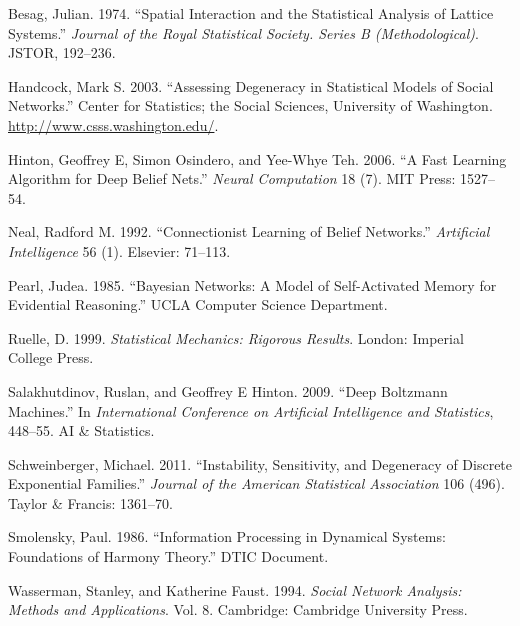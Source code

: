 \documentclass[]{article}
\theoremstyle{definition}
\begin{document}
\hypertarget{refs}{}
\hypertarget{ref-besag1974spatial}{}
Besag, Julian. 1974. ``Spatial Interaction and the Statistical Analysis
of Lattice Systems.'' \emph{Journal of the Royal Statistical Society.
Series B (Methodological)}. JSTOR, 192--236.

\hypertarget{ref-handcock2003assessing}{}
Handcock, Mark S. 2003. ``Assessing Degeneracy in Statistical Models of
Social Networks.'' Center for Statistics; the Social Sciences,
University of Washington. \url{http://www.csss.washington.edu/}.

\hypertarget{ref-hinton2006fast}{}
Hinton, Geoffrey E, Simon Osindero, and Yee-Whye Teh. 2006. ``A Fast
Learning Algorithm for Deep Belief Nets.'' \emph{Neural Computation} 18
(7). MIT Press: 1527--54.

\hypertarget{ref-neal1992connectionist}{}
Neal, Radford M. 1992. ``Connectionist Learning of Belief Networks.''
\emph{Artificial Intelligence} 56 (1). Elsevier: 71--113.

\hypertarget{ref-pearl985bayesian}{}
Pearl, Judea. 1985. ``Bayesian Networks: A Model of Self-Activated
Memory for Evidential Reasoning.'' UCLA Computer Science Department.

\hypertarget{ref-ruelle1999statistical}{}
Ruelle, D. 1999. \emph{Statistical Mechanics: Rigorous Results}. London:
Imperial College Press.

\hypertarget{ref-salakhutdinov2009deep}{}
Salakhutdinov, Ruslan, and Geoffrey E Hinton. 2009. ``Deep Boltzmann
Machines.'' In \emph{International Conference on Artificial Intelligence
and Statistics}, 448--55. AI \& Statistics.

\hypertarget{ref-schweinberger2011instability}{}
Schweinberger, Michael. 2011. ``Instability, Sensitivity, and Degeneracy
of Discrete Exponential Families.'' \emph{Journal of the American
Statistical Association} 106 (496). Taylor \& Francis: 1361--70.

\hypertarget{ref-smolensky1986information}{}
Smolensky, Paul. 1986. ``Information Processing in Dynamical Systems:
Foundations of Harmony Theory.'' DTIC Document.

\hypertarget{ref-wasserman1994social}{}
Wasserman, Stanley, and Katherine Faust. 1994. \emph{Social Network
Analysis: Methods and Applications}. Vol. 8. Cambridge: Cambridge
University Press.
\end{document}

